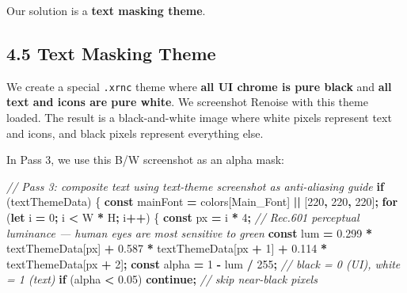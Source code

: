 \documentclass[
  11pt,
  oneside]{report}
\newenvironment{Shaded}{\begin{snugshade}}{\end{snugshade}}
\newcommand{\CommentTok}[1]{\textcolor[rgb]{0.56,0.35,0.01}{\textit{#1}}}
\newcommand{\ControlFlowTok}[1]{\textcolor[rgb]{0.13,0.29,0.53}{\textbf{#1}}}
\newcommand{\DecValTok}[1]{\textcolor[rgb]{0.00,0.00,0.81}{#1}}
\newcommand{\FloatTok}[1]{\textcolor[rgb]{0.00,0.00,0.81}{#1}}
\newcommand{\KeywordTok}[1]{\textcolor[rgb]{0.13,0.29,0.53}{\textbf{#1}}}
\newcommand{\NormalTok}[1]{#1}
\newcommand{\OperatorTok}[1]{\textcolor[rgb]{0.81,0.36,0.00}{\textbf{#1}}}
\newcommand{\StringTok}[1]{\textcolor[rgb]{0.31,0.60,0.02}{#1}}
\begin{document}
Our solution is a \textbf{text masking theme}.

\subsection{4.5 Text Masking Theme}\label{text-masking-theme}

We create a special \texttt{.xrnc} theme where \textbf{all UI chrome is
pure black} and \textbf{all text and icons are pure white}. We
screenshot Renoise with this theme loaded. The result is a
black-and-white image where white pixels represent text and icons, and
black pixels represent everything else.

In Pass 3, we use this B/W screenshot as an alpha mask:

\begin{Shaded}
\begin{Highlighting}[]
\CommentTok{// Pass 3: composite text using text{-}theme screenshot as anti{-}aliasing guide}
\ControlFlowTok{if}\NormalTok{ (textThemeData) \{}
  \KeywordTok{const}\NormalTok{ mainFont }\OperatorTok{=}\NormalTok{ colors[}\StringTok{\textquotesingle{}Main\_Font\textquotesingle{}}\NormalTok{] }\OperatorTok{||}\NormalTok{ [}\DecValTok{220}\OperatorTok{,} \DecValTok{220}\OperatorTok{,} \DecValTok{220}\NormalTok{]}\OperatorTok{;}
  \ControlFlowTok{for}\NormalTok{ (}\KeywordTok{let}\NormalTok{ i }\OperatorTok{=} \DecValTok{0}\OperatorTok{;}\NormalTok{ i }\OperatorTok{\textless{}}\NormalTok{ W }\OperatorTok{*}\NormalTok{ H}\OperatorTok{;}\NormalTok{ i}\OperatorTok{++}\NormalTok{) \{}
    \KeywordTok{const}\NormalTok{ px }\OperatorTok{=}\NormalTok{ i }\OperatorTok{*} \DecValTok{4}\OperatorTok{;}
    \CommentTok{// Rec.601 perceptual luminance — human eyes are most sensitive to green}
    \KeywordTok{const}\NormalTok{ lum }\OperatorTok{=} \FloatTok{0.299} \OperatorTok{*}\NormalTok{ textThemeData[px]}
              \OperatorTok{+} \FloatTok{0.587} \OperatorTok{*}\NormalTok{ textThemeData[px }\OperatorTok{+} \DecValTok{1}\NormalTok{]}
              \OperatorTok{+} \FloatTok{0.114} \OperatorTok{*}\NormalTok{ textThemeData[px }\OperatorTok{+} \DecValTok{2}\NormalTok{]}\OperatorTok{;}
    \KeywordTok{const}\NormalTok{ alpha }\OperatorTok{=} \DecValTok{1} \OperatorTok{{-}}\NormalTok{ lum }\OperatorTok{/} \DecValTok{255}\OperatorTok{;} \CommentTok{// black = 0 (UI), white = 1 (text)}
    \ControlFlowTok{if}\NormalTok{ (alpha }\OperatorTok{\textless{}} \FloatTok{0.05}\NormalTok{) }\ControlFlowTok{continue}\OperatorTok{;}  \CommentTok{// skip near{-}black pixels}


\end{Highlighting}
\end{Shaded}
\end{document}

